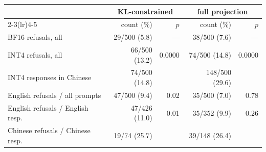\setlength{\tabcolsep}{2pt}
\begin{tabular}{@{}l r r r r@{}}
\toprule
& \multicolumn{2}{c}{KL-constrained} & \multicolumn{2}{c}{full projection} \\
\cmidrule(lr){2-3}\cmidrule(lr){4-5}
& count (\%) & $p$ & count (\%) & $p$ \\
\midrule
BF16 refusals, all & 29/500 (5.8) & --- & 38/500 (7.6) & --- \\
INT4 refusals, all & 66/500 (13.2) & 0.0000 & 74/500 (14.8) & 0.0000 \\
INT4 responses in Chinese & 74/500 (14.8) &  & 148/500 (29.6) &  \\
English refusals / all prompts & 47/500 (9.4) & 0.02 & 35/500 (7.0) & 0.78 \\
English refusals / English resp. & 47/426 (11.0) & 0.01 & 35/352 (9.9) & 0.26 \\
Chinese refusals / Chinese resp. & 19/74 (25.7) &  & 39/148 (26.4) &  \\
\bottomrule
\end{tabular}
